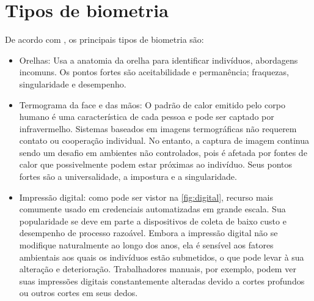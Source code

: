 \section{Tipos de biometria}\label{sec:tiposBiometria}

De acordo com , os principais tipos de biometria são:

\begin{itemize}
    \item Orelhas: Usa a anatomia da orelha para identificar indivíduos, abordagens 
    incomuns. Os pontos fortes são aceitabilidade e permanência; fraquezas, 
    singularidade e desempenho.

    \item Termograma da face e das mãos: O padrão de calor emitido pelo corpo 
    humano é uma característica de cada pessoa e pode ser captado por 
    infravermelho. Sistemas baseados em imagens termográficas não requerem 
    contato ou cooperação individual. No entanto, a captura de imagem continua 
    sendo um desafio em ambientes não controlados, pois é afetada por fontes de 
    calor que possivelmente podem estar próximas ao indivíduo. Seus pontos fortes 
    são a universalidade, a impostura e a singularidade.

    \item Impressão digital: como pode ser vistor na \autoref{fig:digital}, 
    recurso mais comumente usado em credenciais 
     automatizadas em grande escala.  Sua popularidade se deve em parte a 
     dispositivos de coleta de baixo custo e desempenho de processo razoável. 
     Embora a impressão digital não se modifique naturalmente ao longo dos anos, 
     ela é sensível aos fatores ambientais aos quais os indivíduos estão 
     submetidos, o que pode levar à sua alteração e deterioração. Trabalhadores 
     manuais, por exemplo, podem ver suas impressões digitais constantemente 
     alteradas devido a cortes profundos ou outros cortes em seus dedos.
     

\end{itemize}
